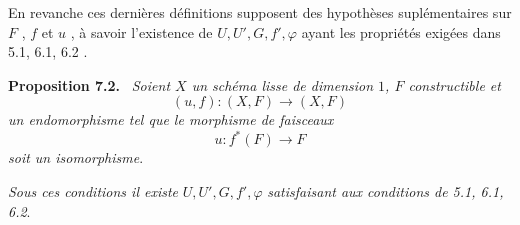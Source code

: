 \documentclass[11pt]{article}
\newenvironment{statement}[1]{\par\medskip\noindent\textbf{#1.}\ }{\par\medskip}
\begin{document}
En revanche ces dernières définitions supposent des hypothèses suplémentaires sur $F$ , $f$ et $u$ , à savoir l'existence de $U, U', G, f', \varphi$ ayant les propriétés exigées dans 5.1, 6.1, 6.2 .


\begin{statement}{Proposition 7.2}
\emph{Soient $X$ un schéma lisse de dimension $1$, $F$ constructible et}
\[
(u,f):(X,F)\longrightarrow (X,F)
\]
\emph{un endomorphisme tel que le morphisme de faisceaux}
\[
u:f^*(F)\longrightarrow F
\]
\emph{soit un isomorphisme}.

\emph{Sous ces conditions il existe} $U,U',G,f',\varphi$ \emph{satisfaisant aux conditions de 5.1, 6.1, 6.2}.
\end{statement}
\end{document}
